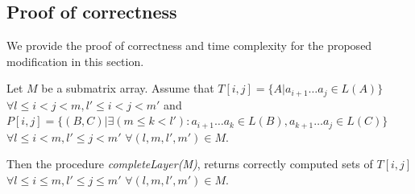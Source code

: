 \subsection{Proof of correctness}

We provide the proof of correctness and time complexity for the proposed modification in this section.

\begin{theorem}
Let $M$ be a submatrix array. Assume that $T[i, j] =  \{ A |  a_{i + 1} \dots a_{j} \in L(A)\}$ $\forall l \leq i < j < m,  l' \leq i < j < m'$ and $P[i, j] =  \{ (B, C) |\exists (m \le k < l'): a_{i + 1} \dots a_{k} \in L(B), a_{k + 1} \dots a_{j} \in L(C)\}$ $\forall l \leq i < m,  l' \leq j < m'$ $\forall (l, m, l', m') \in M$.

Then the procedure \textit{completeLayer(M)}, returns correctly computed sets of $T[i, j]$ $\forall l \leq i \le m,  l' \leq j \le m'$ $\forall (l, m, l', m') \in M$.
\end{theorem}
%
%
